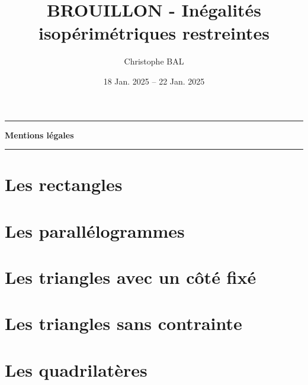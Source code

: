 \documentclass[12pt]{amsart}
\begin{document}
\title{BROUILLON - Inégalités isopérimétriques restreintes}
\author{Christophe BAL}
\date{18 Jan. 2025 -- 22 Jan. 2025}
\maketitle


\begin{center}
	\hrule\vspace{.3em}
	{
		\fontsize{1.35em}{1em}\selectfont
		\textbf{Mentions \og légales \fg}
	}
			
	\vspace{0.45em}
	\doclicenseThis
	\hrule
\end{center}



\setcounter{tocdepth}{2}
\tableofcontents




\newpage
\section{Les rectangles}






\section{Les parallélogrammes}






\section{Les triangles avec un côté fixé}






\section{Les triangles sans contrainte}






\section{Les quadrilatères}


\end{document}
